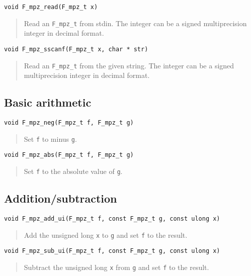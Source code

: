 \documentclass[a4paper,10pt]{article}
\newcommand{\code}{\lstinline}
\begin{document}
\begin{lstlisting}
void F_mpz_read(F_mpz_t x)
\end{lstlisting}
\begin{quote}
Read an \code{F_mpz_t} from stdin. The integer can be a signed multiprecision integer in decimal format.
\end{quote}

\begin{lstlisting}
void F_mpz_sscanf(F_mpz_t x, char * str)
\end{lstlisting}
\begin{quote}
Read an \code{F_mpz_t} from the given string. The integer can be a signed multiprecision integer in decimal format.
\end{quote}

\subsection{Basic arithmetic}

\begin{lstlisting}
void F_mpz_neg(F_mpz_t f, F_mpz_t g)
\end{lstlisting}
\begin{quote}
Set \code{f} to minus \code{g}. 
\end{quote}

\begin{lstlisting}
void F_mpz_abs(F_mpz_t f, F_mpz_t g)
\end{lstlisting}
\begin{quote}
Set \code{f} to the absolute value of \code{g}. 
\end{quote}

\subsection{Addition/subtraction}

\begin{lstlisting}
void F_mpz_add_ui(F_mpz_t f, const F_mpz_t g, const ulong x)
\end{lstlisting}
\begin{quote}
Add the unsigned long \code{x} to \code{g} and set \code{f} to the result.
\end{quote}

\begin{lstlisting}
void F_mpz_sub_ui(F_mpz_t f, const F_mpz_t g, const ulong x)
\end{lstlisting}
\begin{quote}
Subtract the unsigned long \code{x} from \code{g} and set \code{f} to the result.
\end{quote}
\end{document}
